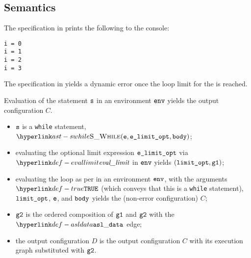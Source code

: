 \subsection{Semantics}
The specification in  prints the
following to the console:
\begin{Verbatim}[fontsize=\footnotesize, frame=single]
i = 0
i = 1
i = 2
i = 3
\end{Verbatim}

The specification in  yields a dynamic
error once the loop limit for the \whilestatementterm{} is reached.

\ProseParagraph
Evaluation of the statement $\vs$ in an environment $\env$ yields
the output configuration $C$.
\AllApply
\begin{itemize}
  \item $\vs$ is a \texttt{while} statement, $\SWhile(\ve, \velimitopt, \vbody)$;
  \item evaluating the optional limit expression $\velimitopt$ via $\evallimit$ in $\env$
        yields $(\vlimitopt, \vgone)$\ProseOrDynErrorDiverging;
  \item evaluating the loop as per  in an environment $\env$,
  with the arguments $\True$ (which conveys that this is a \texttt{while} statement), $\vlimitopt$, $\ve$, and $\vbody$
  yields the (non-error configuration) $C$\ProseOrDynErrorDiverging;
  \item $\vgtwo$ is the ordered composition of $\vgone$ and $\vgtwo$ with the $\asldata$ edge;
  \item the output configuration $D$ is the output configuration $C$ with its execution graph
        substituted with $\vgtwo$.
\end{itemize}
\FormallyParagraph
\begin{mathpar}
\end{mathpar}


